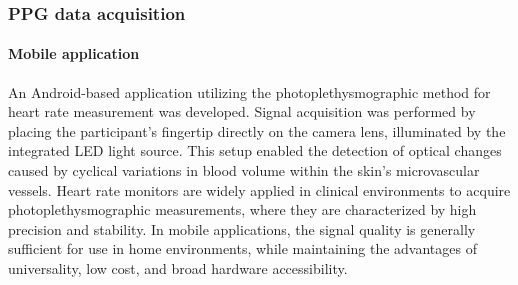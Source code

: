 \documentclass[journal]{IEEEtran}
\begin{document}
\subsubsection{PPG data acquisition}
\paragraph{Mobile application}
An Android-based application utilizing the photoplethysmographic method for heart rate measurement was developed. Signal acquisition was performed by placing the participant’s fingertip directly on the camera lens, illuminated by the integrated LED light source. This setup enabled the detection of optical changes caused by cyclical variations in blood volume within the skin’s microvascular vessels.
\newpage
Heart rate monitors are widely applied in clinical environments to acquire photoplethysmographic measurements, where they are characterized by high precision and stability. In mobile applications, the signal quality is generally sufficient for use in home environments, while maintaining the advantages of universality, low cost, and broad hardware accessibility.
\end{document}
